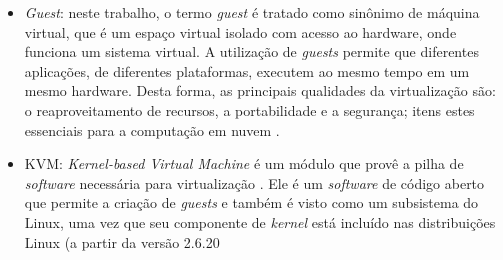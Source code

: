 \begin{itemize}
  \item \textit{Guest}: neste trabalho, o termo \textit{guest} é tratado como sinônimo de máquina virtual, que é um espaço virtual isolado com acesso ao hardware, onde funciona um sistema virtual. A utilização de \textit{guests} permite que diferentes aplicações, de diferentes plataformas, executem ao mesmo tempo em um mesmo hardware. Desta forma, as principais qualidades da virtualização são: o reaproveitamento de recursos, a portabilidade e a segurança; itens estes essenciais para a computação em nuvem \cite{ERCEMAPI2009}.
  \item KVM: \textit{Kernel-based Virtual Machine} é um módulo que provê a pilha de \textit{software} necessária para virtualização \cite{kvm}. Ele é um \textit{software} de código aberto que permite a criação de \textit{guests} e também é visto como um subsistema do Linux, uma vez que seu componente de \textit{kernel} está incluído nas distribuições Linux (a partir da versão 2.6.20
\end{itemize}